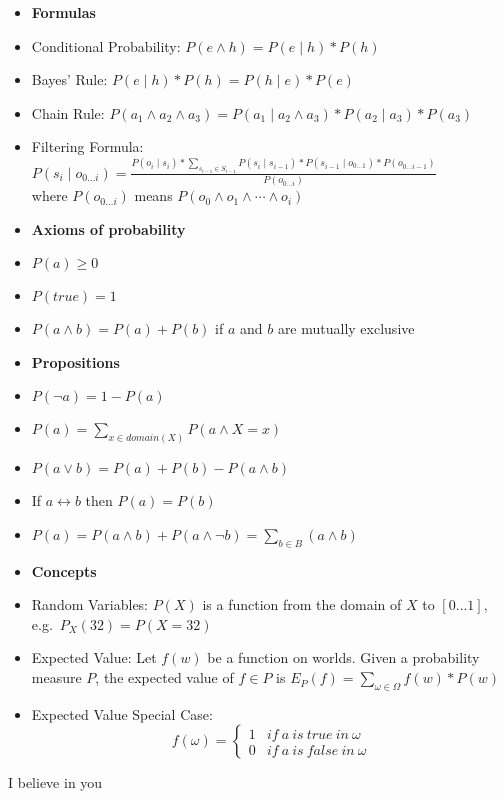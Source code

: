 \documentclass[11pt,landscape]{memoir}
\begin{document}
\begin{multicols}{2}

\begin{itemize}
    \item \textbf{Formulas}
    \item Conditional Probability: $P(e \land h) = P(e \mid h) * P(h)$
    \item Bayes' Rule: $P(e \mid h) * P(h) = P(h \mid e) * P(e)$
    \item Chain Rule: $P(a_1 \land a_2 \land a_3) = P(a_1 \mid a_2 \land a_3) * P(a_2 \mid a_3) * P(a_3)$
    \item Filtering Formula: $P(s_i \mid o_{0 \ldots i}) = \frac{P(o_i \mid s_i) * \sum_{s_{i-1} \in S_{i-1}} P(s_i \mid s_{i-1}) * P(s_{i-1} \mid o_{0 \ldots 1}) * P(o_{0 \ldots i-1})}{P(o_{0 \ldots i})}$ \\
        where $P(o_{0 \ldots i})$ means $P(o_0 \land o_1 \land \cdots \land o_i)$
\end{itemize}

\begin{itemize}
    \item \textbf{Axioms of probability}
    \item $P(a) \ge 0$
    \item $P(true) = 1$
    \item $P(a \land b) = P(a) + P(b)$ if $a$ and $b$ are mutually exclusive
\end{itemize}

\begin{itemize}
    \item \textbf{Propositions}
    \item $P(\lnot a) = 1 - P(a)$
    \item $P(a) = \sum_{x \in domain(X)} P(a \land X = x)$
    \item $P(a \lor b) = P(a) + P(b) - P(a \land b)$
    \item If $a \leftrightarrow b$ then $P(a) = P(b)$
    \item $P(a) = P(a \land b) + P(a \land \lnot b) = \sum_{b \in B}(a \land b)$
\end{itemize}

\begin{itemize}
    \item \textbf{Concepts}
    \item Random Variables: $P(X)$ is a function from the domain of $X$ to $[0 \ldots 1]$, e.g.\ $P_X(32) = P(X=32)$
    \item Expected Value: Let $f(w)$ be a function on worlds. Given a probability measure $P$, the expected value of $f \in P$ is $E_P(f) = \sum_{\omega \in \Omega} f(w) * P(w)$
    \item Expected Value Special Case: \\
        \[ f(\omega) =
        \begin{cases}
            1 & if\ a\ is\ true\ in\ \omega \\
            0 & if\ a\ is\ false\ in\ \omega
        \end{cases}
        \]
\end{itemize}


\end{multicols}

\tiny{I believe in you}
\end{document}
